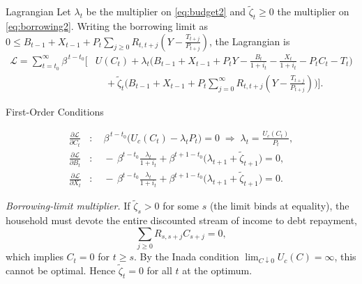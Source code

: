 \documentclass[11pt,aspectratio=169]{beamer}
\begin{document}
\begin{frame}{Lagrangian}
Let $\lambda_t$ be the multiplier on \eqref{eq:budget2} and $\tilde{\zeta}_t \ge 0$ the multiplier on \eqref{eq:borrowing2}.
Writing the borrowing limit as $0 \le B_{t-1} + X_{t-1} + P_t \sum_{j\ge 0} R_{t,t+j}\!\left(Y-\frac{T_{t+j}}{P_{t+j}}\right)$,
the Lagrangian is
\begin{equation} \label{eq:lagrangian}
\begin{aligned}
\mathcal{L} 
= \sum_{t=t_0}^{\infty} \beta^{\,t-t_0}\Big[ & U(C_t) 
+ \lambda_t \!\Big(B_{t-1}+X_{t-1}+P_t Y - \frac{B_t}{1+i_t} - \frac{X_t}{1+i_t} - P_t C_t - T_t \Big) \\
&\quad + \tilde{\zeta}_t \!\Big( B_{t-1} + X_{t-1} 
+ P_t \sum_{j=0}^{\infty} R_{t,t+j} \!\left( Y - \frac{T_{t+j}}{P_{t+j}} \right) \Big) \Big].
\end{aligned}
\end{equation}
\end{frame}

\begin{frame}{First-Order Conditions}


\begin{align}
\frac{\partial \mathcal{L}}{\partial C_t} &: \quad 
\beta^{\,t-t_0}\!\big(U_c(C_t)-\lambda_t P_t\big)=0 
\;\Rightarrow\;
\lambda_t=\frac{U_c(C_t)}{P_t}, 
\label{eq:foc_c}\\[1mm]
\frac{\partial \mathcal{L}}{\partial B_t} &: \quad 
-\,\beta^{t-t_0}\frac{\lambda_t}{1+i_t}
+\beta^{t+1-t_0}\big(\lambda_{t+1}+\tilde{\zeta}_{t+1}\big)=0,
\label{eq:foc_b}\\[1mm]
\frac{\partial \mathcal{L}}{\partial X_t} &: \quad 
-\,\beta^{t-t_0}\frac{\lambda_t}{1+i_t}
+\beta^{t+1-t_0}\big(\lambda_{t+1}+\tilde{\zeta}_{t+1}\big)=0.
\label{eq:foc_x}
\end{align}

\vspace{0.3cm}
\scriptsize
\textit{Borrowing-limit multiplier.}  
If $\tilde{\zeta}_s>0$ for some $s$ (the limit binds at equality), the household must devote the entire discounted stream of income to debt repayment,
\[
\sum_{j\ge0}R_{s,s+j}C_{s+j}=0,
\]
which implies $C_t=0$ for $t\ge s$.  
By the Inada condition $\lim_{C\downarrow0}U_c(C)=\infty$, this cannot be optimal.  
Hence $\tilde{\zeta}_t=0$ for all $t$ at the optimum.
\end{frame}
\end{document}
